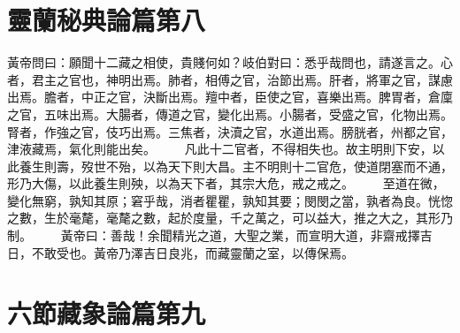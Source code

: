 \section{靈蘭秘典論篇第八}

黃帝問曰：願聞十二藏之相使，貴賤何如？岐伯對曰：悉乎哉問也，請遂言之。心者，君主之官也，神明出焉。肺者，相傅之官，治節出焉。肝者，將軍之官，謀慮出焉。膽者，中正之官，決斷出焉。羶中者，臣使之官，喜樂出焉。脾胃者，倉廩之官，五味出焉。大腸者，傳道之官，變化出焉。小腸者，受盛之官，化物出焉。腎者，作強之官，伎巧出焉。三焦者，決瀆之官，水道出焉。膀胱者，州都之官，津液藏焉，氣化則能出矣。
　　凡此十二官者，不得相失也。故主明則下安，以此養生則壽，歿世不殆，以為天下則大昌。主不明則十二官危，使道閉塞而不通，形乃大傷，以此養生則殃，以為天下者，其宗大危，戒之戒之。
　　至道在微，變化無窮，孰知其原；窘乎哉，消者瞿瞿，孰知其要；閔閔之當，孰者為良。恍惚之數，生於毫氂，毫氂之數，起於度量，千之萬之，可以益大，推之大之，其形乃制。
　　黃帝曰：善哉！余聞精光之道，大聖之業，而宣明大道，非齋戒擇吉日，不敢受也。黃帝乃澤吉日良兆，而藏靈蘭之室，以傳保焉。

\section{六節藏象論篇第九}

